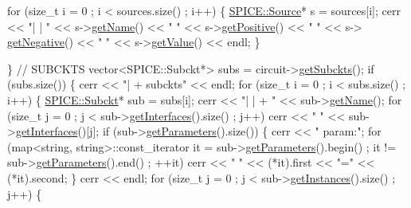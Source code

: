 \begin{DoxyCodeInclude}
        \textcolor{keywordflow}{for} (\textcolor{keywordtype}{size\_t} i = 0 ; i < sources.size() ; i++) \{
            \hyperlink{class_s_p_i_c_e_1_1_source}{SPICE::Source}* s = sources[i];
            cerr << \textcolor{stringliteral}{"| | "} <<  s->\hyperlink{class_s_p_i_c_e_1_1_source_ac0fc966d4386ddb71d99361e3fccb311}{getName}() << \textcolor{stringliteral}{" "} << s->\hyperlink{class_s_p_i_c_e_1_1_source_a1adb347b9a2c2da556e4417ab0eec0e1}{getPositive}() << \textcolor{stringliteral}{" "} << s->
      \hyperlink{class_s_p_i_c_e_1_1_source_a8b4ab73ed1d99c533aa22af0a37ebb0d}{getNegative}() << \textcolor{stringliteral}{" "} << s->\hyperlink{class_s_p_i_c_e_1_1_source_a4c052cb2622c580a250b2c783a436882}{getValue}() << endl;
        \}

    \}
    \textcolor{comment}{// SUBCKTS}
    vector<SPICE::Subckt*> subs = circuit->\hyperlink{class_s_p_i_c_e_1_1_circuit_adcc4ca0de68f8ee05f0d5db3b7604930}{getSubckts}();
    \textcolor{keywordflow}{if} (subs.size()) \{
        cerr << \textcolor{stringliteral}{"| + subckts"} << endl;
        \textcolor{keywordflow}{for} (\textcolor{keywordtype}{size\_t} i = 0 ; i < subs.size() ; i++) \{
            \hyperlink{class_s_p_i_c_e_1_1_subckt}{SPICE::Subckt}* sub = subs[i];
            cerr << \textcolor{stringliteral}{"| | + "} << sub->\hyperlink{class_s_p_i_c_e_1_1_subckt_af55b1fe10eacd22c7ff3544b5ed32ef3}{getName}(); 
            \textcolor{keywordflow}{for} (\textcolor{keywordtype}{size\_t} j = 0 ; j < sub->\hyperlink{class_s_p_i_c_e_1_1_subckt_a5df00fe6eb5e287abef28c76ce88bd1e}{getInterfaces}().size() ; j++)
                cerr << \textcolor{stringliteral}{" "} << sub->\hyperlink{class_s_p_i_c_e_1_1_subckt_a5df00fe6eb5e287abef28c76ce88bd1e}{getInterfaces}()[j];
            \textcolor{keywordflow}{if} (sub->\hyperlink{class_s_p_i_c_e_1_1_subckt_aee7d59083b78d31ac5c19ab508da91e0}{getParameters}().size()) \{
                cerr << \textcolor{stringliteral}{" param:"};
                \textcolor{keywordflow}{for} (map<string, string>::const\_iterator it = sub->\hyperlink{class_s_p_i_c_e_1_1_subckt_aee7d59083b78d31ac5c19ab508da91e0}{getParameters}().begin() ; 
      it != sub->\hyperlink{class_s_p_i_c_e_1_1_subckt_aee7d59083b78d31ac5c19ab508da91e0}{getParameters}().end() ; ++it)
                    cerr << \textcolor{stringliteral}{" "} << (*it).first << \textcolor{stringliteral}{"="} << (*it).second;
            \}
            cerr << endl;
            \textcolor{keywordflow}{for} (\textcolor{keywordtype}{size\_t} j = 0 ; j < sub->\hyperlink{class_s_p_i_c_e_1_1_subckt_a8e6e58ffab876152a740092520c35d73}{getInstances}().size() ; j++) \{

\end{DoxyCodeInclude}
